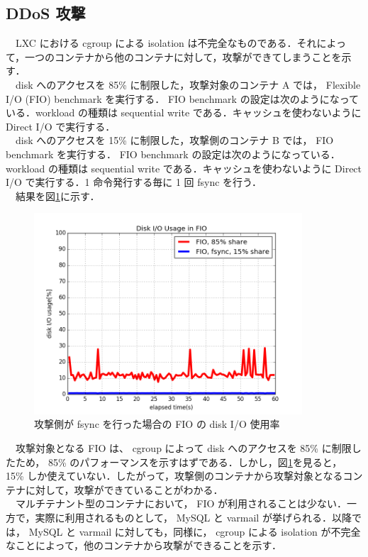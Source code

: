 \documentclass[graduation-thesis]{jsarticle}
\begin{document}
\subsection{DDoS 攻撃}
　LXC における cgroup による isolation は不完全なものである．それによって，一つのコンテナから他のコンテナに対して，攻撃ができてしまうことを示す．\\
　disk へのアクセスを 85\% に制限した，攻撃対象のコンテナ A では， Flexible I/O (FIO) benchmark を実行する． FIO benchmark の設定は次のようになっている．workload の種類は sequential write である．キャッシュを使わないように Direct I/O で実行する．\\
　disk へのアクセスを 15\% に制限した，攻撃側のコンテナ B では， FIO benchmark を実行する． FIO benchmark の設定は次のようになっている． workload の種類は sequential write である．キャッシュを使わないように Direct I/O で実行する．1 命令発行する毎に 1 回 fsync を行う．\\
　結果を図\ref{fig:fsync1}に示す．\\
\begin{figure}[H]
	\begin{center}
		\includegraphics[width=10.0cm]{images/FiguresForGraduation/fio_fsync1.png}
		\caption{攻撃側が fsync を行った場合の FIO の disk I/O 使用率}
		\label{fig:fsync1}
	\end{center}
\end{figure}
　攻撃対象となる FIO は、 cgroup によって disk へのアクセスを 85\% に制限したため， 85\% のパフォーマンスを示すはずである．しかし，図\ref{fig:fsync1}を見ると， 15\% しか使えていない．したがって，攻撃側のコンテナから攻撃対象となるコンテナに対して，攻撃ができていることがわかる．\\
　マルチテナント型のコンテナにおいて， FIO が利用されることは少ない．一方で，実際に利用されるものとして， MySQL と varmail が挙げられる．以降では， MySQL と varmail に対しても，同様に， cgroup による isolation が不完全なことによって，他のコンテナから攻撃ができることを示す．\\
\end{document}
